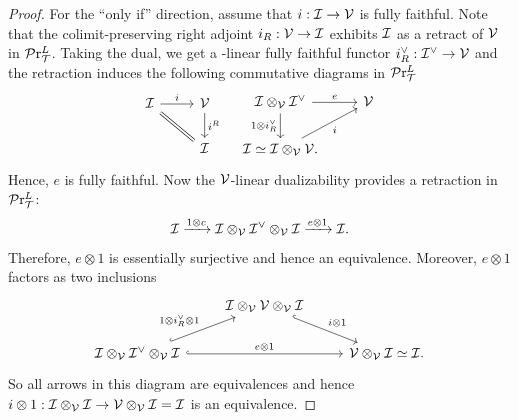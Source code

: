 \documentclass[10pt,a4paper,oneside]{article}
\begin{document}
\begin{proof}
For the ``only if'' direction, 
assume that $i:\mathcal{I}\rightarrow\mathcal{V}$ is fully faithful.  
Note that the colimit-preserving right adjoint $i_R:\mathcal{V}\to\mathcal{I}$ exhibits $\mathcal{I}$ as a retract of $\mathcal{V}$ in $\mathcal{P}\mathrm{r}^L_{\mathcal{T}}$. Taking the dual, we get %
a \mcv-linear fully faithful functor $i_R^\vee: \mathcal{I}^\vee \to \mathcal{V}$ and the retraction induces the following commutative diagrams in $\mathcal{P}\mathrm{r}^L_{\mathcal{T}}$
$$\begin{tikzcd}
\mci \arrow[r, "i"] \arrow[rd, Rightarrow, no head] & \mcv \arrow[d, "i^R"] \\
& \mci                 
\end{tikzcd}\quad
\begin{tikzcd}
\mci\otimes_\mcv\mci^\vee \arrow[d, "1\otimes i^\vee_R"'] \arrow[r, "e"] & \mcv \\
\mci\simeq\mci\otimes_\mcv\mcv.  \arrow[ru, "i"']                    &          
\end{tikzcd}$$
Hence, $e$ %
is fully faithful. %
Now the $\mathcal{V}$-linear dualizability provides a retraction in $\mathcal{P}\mathrm{r}^L_{\mathcal{T}}$:
$$\mathcal{I}\xrightarrow{1\otimes c}\mathcal{I}\otimes_{\mathcal{V}}\mathcal{I}^\vee\otimes_\mathcal{V}\mathcal{I}\xrightarrow{e\otimes 1}\mathcal{I}.$$ 
Therefore, $e\otimes 1$ is essentially surjective and hence an equivalence. Moreover, $e\otimes 1$ factors as two inclusions
$$%
\begin{tikzcd}
& \mci\otimes_{\mcv}\mcv\otimes_\mcv\mci \arrow[rd, "i\otimes 1",hook] &                                                  \\
\mci\otimes_{\mcv}\mci^\vee\otimes_\mcv\mci \arrow[rr, "e\otimes 1",hook] \arrow[ru, "1\otimes i_R^\vee \otimes 1",hook] &                                                                 & \mcv\otimes_\mcv\mci\simeq\mci.
\end{tikzcd}$$
So all arrows in this diagram are equivalences and hence $i\otimes 1:\mathcal{I}\otimes_\mathcal{V}\mathcal{I} \to\mathcal{V}\otimes_\mathcal{V}\mathcal{I}=\mathcal{I}$ is an equivalence.
\end{proof}
\end{document}

